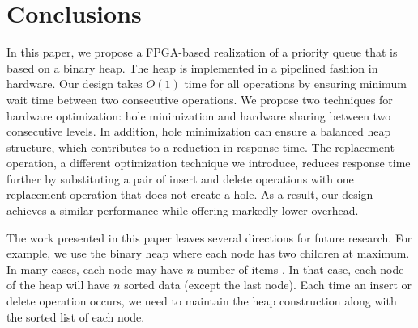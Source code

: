 \section{Conclusions}
\label{s:cons}

In this paper, we propose a FPGA-based realization of a priority queue that is based on a binary heap.
The heap is implemented in a pipelined fashion in hardware.
Our design takes $O(1)$ time for all operations by ensuring minimum wait time between two consecutive operations.
We propose two techniques for hardware optimization: hole minimization and hardware sharing between two consecutive levels.
In addition, hole minimization can ensure a balanced heap structure, which contributes to a reduction in response time.
The replacement operation, a different optimization technique we introduce, reduces response time further by substituting a pair of insert and delete operations with one replacement operation that does not create a hole.
As a result, our design achieves a similar performance while offering markedly lower overhead.

The work presented in this paper leaves several directions for future research. For example, we use the binary heap where each node has two children at maximum. In many cases, each node may have $n$ number of items \cite{pq3}. In that case, each node of the heap will have $n$ sorted data (except the last node). Each time an insert or delete operation occurs, we need to maintain the heap construction along with the sorted list of each node.

\begin{comment}
The work presented in this paper leaves several directions for the future research. We presented some of these ideas here.
 \begin{itemize}
 \item We used the binary heap where each node has maximum two children. In general, each node may have $n$ number of items \cite{pq3}.
In that case, each node of the heap will have $n$ sorted data (except the last node).
For each time of {\it insert} or {\it delete}, we need to assure heap construction along with the sorted list of each node.
There could be abundant parallelism in operations, but the implementation may incur large overhead.
 \item On-chip memory is limited (32 MB in our case, which means $2^{25}$ nodes can be simulated). To make the design more scalable, we can configure this into FPGA-ARM-core where FPGA is integrated into ARM processor. External RAM can be used, keeping in mind that this would lead slow design for extra memory access time.
 \end{itemize}
\end{comment}
